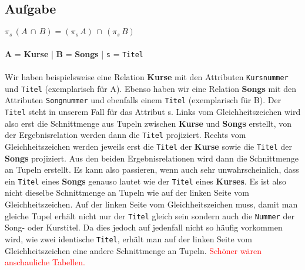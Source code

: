 \documentclass[11pt,a4paper,DIV=9]{scrartcl}
\newcounter{temp}
\newcommand{\aufgabe}[1]{
  \setcounter{temp}{\value{subsection}}
  \setcounter{subsection}{#1}
  \addtocounter{subsection}{-1}
  \subsection{Aufgabe}
  \setcounter{subsection}{\value{temp}}
}
\begin{document}
\aufgabe{3}
$ \pi _{s}\, (A\, \cap \, B) = (\pi _{s} \, A)\, \cap \,(\pi _{s}\, B)$
\\\\ \textbf{A} = \textbf{Kurse} | \textbf{B} = \textbf{Songs} | \texttt{s} = \texttt{Titel} 
\\\\Wir haben beispielsweise eine Relation \textbf{Kurse} mit den Attributen \texttt{Kursnummer} und \texttt{Titel} (exemplarisch f\"ur A). Ebenso haben wir eine Relation \textbf{Songs} mit den Attributen \texttt{Songnummer} und ebenfalls einem \texttt{Titel} (exemplarisch f\"ur B). Der \texttt{Titel} steht in unserem Fall f\"ur das Attribut s. Links vom Gleichheitszeichen wird also erst die Schnittmenge aus Tupeln zwischen \textbf{Kurse} und \textbf{Songs} erstellt, von der Ergebnisrelation werden dann die \texttt{Titel} projiziert. Rechts vom Gleichheitszeichen werden jeweils erst die \texttt{Titel} der \textbf{Kurse} sowie die \texttt{Titel} der \textbf{Songs} projiziert. Aus den beiden Ergebnisrelationen wird dann die Schnittmenge an Tupeln erstellt. Es kann also passieren, wenn auch sehr unwahrscheinlich, dass ein \texttt{Titel} eines \textbf{Songs} genauso lautet wie der \texttt{Titel} eines \textbf{Kurses}. Es ist also nicht dieselbe Schnittmenge an Tupeln wie auf der linken Seite vom Gleichheitszeichen. Auf der linken Seite vom Gleichheitszeichen muss, damit man gleiche Tupel erh\"alt nicht nur der \texttt{Titel} gleich sein sondern auch die \texttt{Nummer} der Song- oder Kurstitel. Da dies jedoch auf jedenfall nicht so h\"aufig vorkommen wird, wie zwei identische \texttt{Titel}, erh\"alt man auf der linken Seite vom Gleichheitszeichen eine andere Schnittmenge an Tupeln.
\textcolor{red}{Sch\"oner w\"aren anschauliche Tabellen.}
\end{document}
